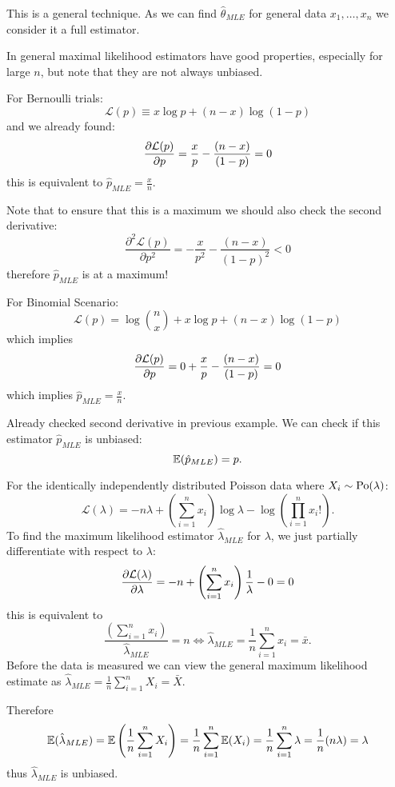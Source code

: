 \documentclass[10pt, a4paper]{article}
\begin{document}
This is a general technique.
As we can find $\hat{\theta}_{MLE}$ for general data $x_1, \dotsc, x_n$ we consider it a full estimator.

In general maximal likelihood estimators have good properties,
especially for large $n$,
but note that they are not always unbiased.

\begin{example}
    For Bernoulli trials:
    \[
    \mathcal{L}(p) \equiv x\log{p} + (n - x)\log(1 - p)
    \]
    and we already found:
    \[
    \pd[\mathcal{L}(p)]{p} = \frac{x}{p} - \frac{(n - x)}{(1 - p)} = 0
    \]
    this is equivalent to $\hat{p}_{MLE} = \frac{x}{n}$.

    Note that to ensure that this is a maximum we should also check the second derivative:
    \[
    \frac{\partial ^ 2\mathcal{L}(p)}{\partial p ^ 2} = -\frac{x}{p ^ 2} - \frac{(n - x)}{(1 - p) ^ 2} < 0
    \]
    therefore $\hat{p}_{MLE}$ is at a maximum!
\end{example}

\begin{example}
    For Binomial Scenario:
    \[
    \mathcal{L}(p) = \log\binom{n}{x} + x\log{p} + (n - x)\log(1 - p)
    \]
    which implies
    \[
    \pd[\mathcal{L}(p)]{p} = 0 + \frac{x}{p} - \frac{(n - x)}{(1 - p)} = 0
    \]
    which implies $\hat{p}_{MLE} = \frac{x}{n}$.

    Already checked second derivative in previous example.
    We can check if this estimator $\hat{p}_{MLE}$ is unbiased:
    \[
    \E(\hat{p}_{MLE}) = p.
    \]
\end{example}

\begin{example}
    For the identically independently distributed Poisson data where $X_i \sim \Po(\lambda)$:
    \[
    \mathcal{L}(\lambda) = -n\lambda + \left(\sum_{i = 1}^{n}x_i\right)\log{\lambda} - \log\left(\prod_{i = 1}^{n}x_i!\right).
    \]
    To find the maximum likelihood estimator $\hat{\lambda}_{MLE}$ for $\lambda$,
    we just partially differentiate with respect to $\lambda$:
    \[
    \pd[\mathcal{L}(\lambda)]{\lambda} = -n + \left(\sum_{i = 1}^{n}x_i\right)\frac{1}{\lambda} - 0 = 0
    \]
    this is equivalent to
    \[
    \frac{\left(\sum_{i = 1}^{n}x_i\right)}{\hat{\lambda}_{MLE}} = n \iff \hat{\lambda}_{MLE} = \frac{1}{n}\sum_{i = 1}^{n}x_i = \bar{x}.
    \]
    Before the data is measured we can view the general maximum likelihood estimate as $\hat{\lambda}_{MLE} = \frac{1}{n}\sum_{i = 1}^{n}X_i = \bar{X}$.

    Therefore
    \[
    \E(\hat{\lambda}_{MLE}) = \E\left(\frac{1}{n}\sum_{i = 1}^{n}X_i\right) = \frac{1}{n}\sum_{i = 1}^{n}\E(X_i) = \frac{1}{n}\sum_{i = 1}^{n}\lambda = \frac{1}{n}(n\lambda) = \lambda
    \]
    thus $\hat{\lambda}_{MLE}$ is unbiased.
\end{example}
\end{document}
